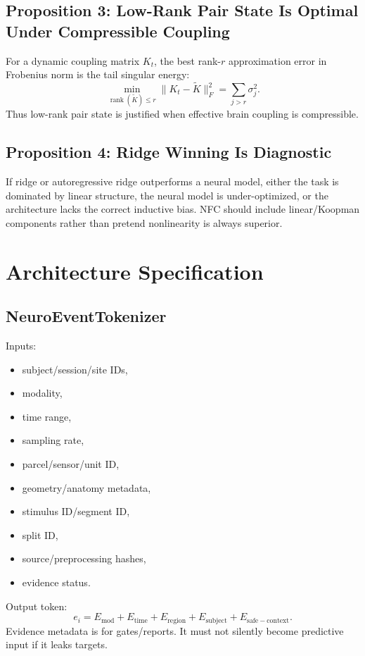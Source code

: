 \documentclass[11pt]{article}
\newcommand{\rank}{\operatorname{rank}}
\begin{document}
\subsection{Proposition 3: Low-Rank Pair State Is Optimal Under Compressible Coupling}
For a dynamic coupling matrix $K_t$, the best rank-$r$ approximation error in Frobenius norm is the tail singular energy:
\begin{equation}
\min_{\rank(\tilde{K})\le r}\|K_t-\tilde{K}\|_F^2=\sum_{j>r}\sigma_j^2.
\end{equation}
Thus low-rank pair state is justified when effective brain coupling is compressible.

\subsection{Proposition 4: Ridge Winning Is Diagnostic}
If ridge or autoregressive ridge outperforms a neural model, either the task is dominated by linear structure, the neural model is under-optimized, or the architecture lacks the correct inductive bias. NFC should include linear/Koopman components rather than pretend nonlinearity is always superior.

\section{Architecture Specification}

\subsection{NeuroEventTokenizer}
Inputs:
\begin{itemize}
\item subject/session/site IDs,
\item modality,
\item time range,
\item sampling rate,
\item parcel/sensor/unit ID,
\item geometry/anatomy metadata,
\item stimulus ID/segment ID,
\item split ID,
\item source/preprocessing hashes,
\item evidence status.
\end{itemize}
Output token:
\begin{equation}
e_i=E_{\mathrm{mod}}+E_{\mathrm{time}}+E_{\mathrm{region}}+E_{\mathrm{subject}}+E_{\mathrm{safe-context}}.
\end{equation}
Evidence metadata is for gates/reports. It must not silently become predictive input if it leaks targets.
\end{document}
